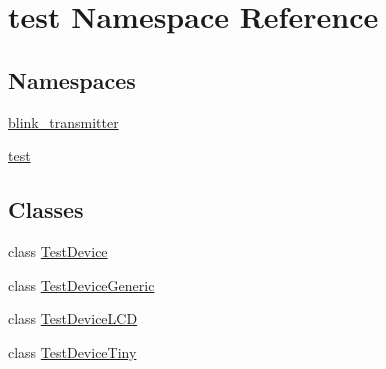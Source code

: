 \hypertarget{namespacetest}{\section{test Namespace Reference}
\label{namespacetest}
}
\subsection*{Namespaces}
\begin{DoxyCompactItemize}
\item 
\hyperlink{namespacetest_1_1blink__transmitter}{blink\-\_\-transmitter}
\item 
\hyperlink{namespacetest_1_1test}{test}
\end{DoxyCompactItemize}
\subsection*{Classes}
\begin{DoxyCompactItemize}
\item 
class \hyperlink{classtest_1_1TestDevice}{Test\-Device}
\item 
class \hyperlink{classtest_1_1TestDeviceGeneric}{Test\-Device\-Generic}
\item 
class \hyperlink{classtest_1_1TestDeviceLCD}{Test\-Device\-L\-C\-D}
\item 
class \hyperlink{classtest_1_1TestDeviceTiny}{Test\-Device\-Tiny}
\end{DoxyCompactItemize}
